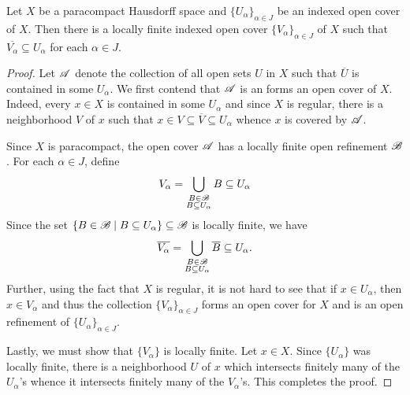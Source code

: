 \begin{lemma}
    Let $X$ be a paracompact Hausdorff space and $\{U_\alpha\}_{\alpha\in J}$ be an indexed open cover of $X$. Then there is a locally finite indexed open cover $\{V_\alpha\}_{\alpha\in J}$ of $X$ such that $\overline{V_\alpha}\subseteq U_\alpha$ for each $\alpha\in J$.
\end{lemma}
\begin{proof}
    Let $\mathscr A$ denote the collection of all open sets $U$ in $X$ such that $\overline U$ is contained in some $U_\alpha$. We first contend that $\mathscr A$ is an forms an open cover of $X$. Indeed, every $x\in X$ is contained in some $U_\alpha$ and since $X$ is regular, there is a neighborhood $V$ of $x$ such that $x\in V\subseteq\overline V\subseteq U_\alpha$ whence $x$ is covered by $\mathscr A$.

    Since $X$ is paracompact, the open cover $\mathscr A$ has a locally finite open refinement $\mathscr B$. For each $\alpha\in J$, define 
    \begin{equation*}
        V_\alpha = \bigcup_{\substack{B\in\mathscr B\\ B\subseteq U_\alpha}}B\subseteq U_\alpha
    \end{equation*}
    Since the set $\{B\in\mathscr B\mid B\subseteq U_\alpha\}\subseteq\mathscr B$ is locally finite, we have 
    \begin{equation*}
        \overline{V_\alpha} = \bigcup_{\substack{B\in\mathscr B\\ B\subseteq U_\alpha}}\overline B\subseteq U_\alpha.
    \end{equation*}
    Further, using the fact that $X$ is regular, it is not hard to see that if $x\in U_\alpha$, then $x\in V_\alpha$ and thus the collection $\{V_\alpha\}_{\alpha\in J}$ forms an open cover for $X$ and is an open refinement of $\{U_\alpha\}_{\alpha\in J}$.

    Lastly, we must show that $\{V_\alpha\}$ is locally finite. Let $x\in X$. Since $\{U_\alpha\}$ was locally finite, there is a neighborhood $U$ of $x$ which intersects finitely many of the $U_\alpha$'s whence it intersects finitely many of the $V_\alpha$'s. This completes the proof.
\end{proof}

